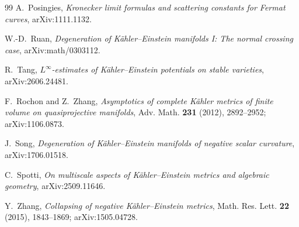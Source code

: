 \documentclass[11pt,a4paper]{ltjsarticle}
\theoremstyle{definition}
\theoremstyle{remark}
\begin{document}
\begin{thebibliography}{99}
A.~Posingies,
\emph{Kronecker limit formulas and scattering constants for Fermat curves},
arXiv:1111.1132.

W.-D.~Ruan,
\emph{Degeneration of Kähler--Einstein manifolds I: The normal crossing case},
arXiv:math/0303112.

R.~Tang,
\emph{$L^\infty$-estimates of Kähler--Einstein potentials on stable varieties},
arXiv:2606.24481.

F.~Rochon and Z.~Zhang,
\emph{Asymptotics of complete Kähler metrics of finite volume on quasiprojective manifolds},
Adv. Math. \textbf{231} (2012), 2892--2952; arXiv:1106.0873.

J.~Song,
\emph{Degeneration of Kähler--Einstein manifolds of negative scalar curvature},
arXiv:1706.01518.

C.~Spotti,
\emph{On multiscale aspects of Kähler--Einstein metrics and algebraic geometry},
arXiv:2509.11646.

Y.~Zhang,
\emph{Collapsing of negative Kähler--Einstein metrics},
Math. Res. Lett. \textbf{22} (2015), 1843--1869; arXiv:1505.04728.

\end{thebibliography}
\end{document}

